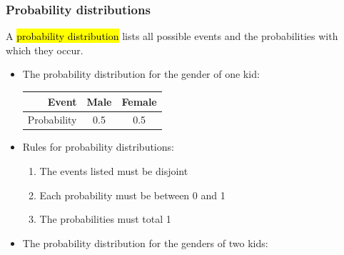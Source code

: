 
\begin{frame}
\frametitle{Probability distributions}

A \hl{probability distribution} lists all possible events and the probabilities with which they occur.

\begin{itemize}
\item The probability distribution for the gender of one kid:
{\footnotesize 
\begin{center}
\begin{tabular}{r | c | c}
Event    & Male		& Female \\
\hline
Probability	& 0.5		& 0.5 \\
\end{tabular}
\end{center}
}

\pause

\item Rules for probability distributions:
\begin{enumerate}
\item The events listed must be disjoint
\item Each probability must be between 0 and 1
\item The probabilities must total 1
\end{enumerate}

\pause

\item The probability distribution for the genders of two kids:

\end{itemize}

\end{frame}


